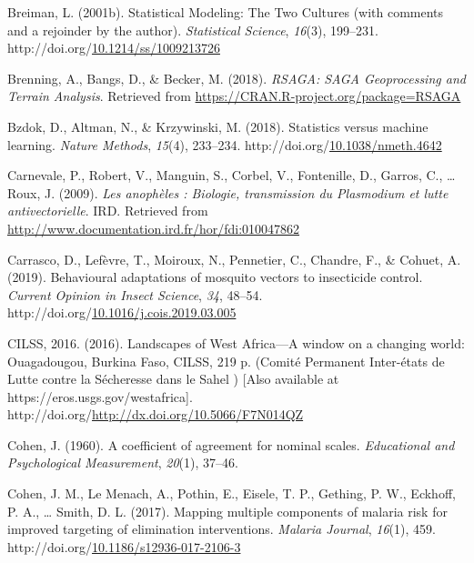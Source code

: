 \documentclass[12pt,twoside]{reedthesis}
\newlength{\cslhangindent}
\newenvironment{CSLReferences}[2] %
 {%
  \setlength{\parindent}{0pt}
  \ifodd #1 \everypar{\setlength{\hangindent}{\cslhangindent}}\ignorespaces\fi
  \ifnum #2 > 0
  \setlength{\parskip}{#2\baselineskip}
  \fi
 }%
 {}
\begin{document}
\begin{CSLReferences}{1}{0}
\leavevmode{}%
Breiman, L. (2001b). Statistical {Modeling}: {The} {Two} {Cultures} (with comments and a rejoinder by the author). \emph{Statistical Science}, \emph{16}(3), 199--231. http://doi.org/\href{https://doi.org/10.1214/ss/1009213726}{10.1214/ss/1009213726}

\leavevmode{}%
Brenning, A., Bangs, D., \& Becker, M. (2018). \emph{{RSAGA}: {SAGA} {Geoprocessing} and {Terrain} {Analysis}}. Retrieved from \url{https://CRAN.R-project.org/package=RSAGA}

\leavevmode{}%
Bzdok, D., Altman, N., \& Krzywinski, M. (2018). Statistics versus machine learning. \emph{Nature Methods}, \emph{15}(4), 233--234. http://doi.org/\href{https://doi.org/10.1038/nmeth.4642}{10.1038/nmeth.4642}

\leavevmode{}%
Carnevale, P., Robert, V., Manguin, S., Corbel, V., Fontenille, D., Garros, C., \ldots{} Roux, J. (2009). \emph{Les anophèles : Biologie, transmission du {Plasmodium} et lutte antivectorielle}. IRD. Retrieved from \url{http://www.documentation.ird.fr/hor/fdi:010047862}

\leavevmode{}%
Carrasco, D., Lefèvre, T., Moiroux, N., Pennetier, C., Chandre, F., \& Cohuet, A. (2019). Behavioural adaptations of mosquito vectors to insecticide control. \emph{Current Opinion in Insect Science}, \emph{34}, 48--54. http://doi.org/\href{https://doi.org/10.1016/j.cois.2019.03.005}{10.1016/j.cois.2019.03.005}

\leavevmode{}%
CILSS, 2016. (2016). Landscapes of {West} {Africa}---{A} window on a changing world: {Ouagadougou}, {Burkina} {Faso}, {CILSS}, 219 p. ({Comité} {Permanent} {Inter}-états de {Lutte} contre la {Sécheresse} dans le {Sahel} ) {[}{Also} available at https://eros.usgs.gov/westafrica{]}. http://doi.org/\url{http://dx.doi.org/10.5066/F7N014QZ}

\leavevmode{}%
Cohen, J. (1960). A coefficient of agreement for nominal scales. \emph{Educational and Psychological Measurement}, \emph{20}(1), 37--46.

\leavevmode{}%
Cohen, J. M., Le Menach, A., Pothin, E., Eisele, T. P., Gething, P. W., Eckhoff, P. A., \ldots{} Smith, D. L. (2017). Mapping multiple components of malaria risk for improved targeting of elimination interventions. \emph{Malaria Journal}, \emph{16}(1), 459. http://doi.org/\href{https://doi.org/10.1186/s12936-017-2106-3}{10.1186/s12936-017-2106-3}


\end{CSLReferences}
\end{document}

